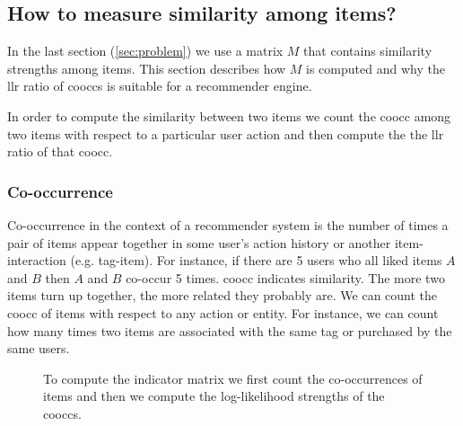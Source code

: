 \subsection{How to measure similarity among items?}
\label{sec:llr}

In the last section (\ref{sec:problem}) we use a matrix $M$ that contains similarity strengths among items. This section describes how $M$ is computed and why the \gls{llr} ratio of \glspl{coocc} is suitable for a recommender engine.

In order to compute the similarity between two items we count the \gls{coocc} among two items with respect to a particular user action and then compute the the \gls{llr} ratio of that \gls{coocc}.

\subsubsection{Co-occurrence}
\label{sec:cooccurence}

Co-occurrence in the context of a recommender system is the number of times a pair of items appear together in some user's action history or another item-interaction (e.g. tag-item). For instance, if there are 5 users who all liked items $A$ and $B$ then $A$ and $B$ co-occur 5 times. \Gls{coocc} indicates similarity. The more two items turn up together, the more related they probably are. We can count the \gls{coocc} of items with respect to any action or entity. For instance, we can count how many times two items are associated with the same tag or purchased by the same users.

\begin{figure}
\centering
{}
\caption{To compute the indicator matrix we first count the co-occurrences of items and then we compute the log-likelihood strengths of the \glspl{coocc}.}
\label{fig:llrworkflow}
\end{figure}

